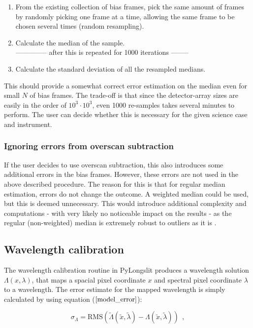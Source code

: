 \documentclass{article}
\begin{document}
\begin{enumerate}
    \item From the existing collection of bias frames, pick the same amount of frames by randomly picking one frame at a time, allowing the same frame to be chosen several times (random resampling).
    \item Calculate the median of the sample. \\ 
    -------------- after this is repeated for 1000 iterations --------
    \item Calculate the standard deviation of all the resampled medians.
\end{enumerate}

\noindent This should provide a somewhat correct error estimation on the median even for small $N$ of bias frames. The trade-off is that since the detector-array sizes are easily in the order of $10^3 \cdot 10^3$, even 1000 re-samples takes several minutes to perform. The user can decide whether this is necessary for the given science case and instrument.

\subsubsection{Ignoring errors from overscan subtraction}\label{ignore_overscan}

If the user decides to use overscan subtraction, this also introduces some additional errors in the bias frames. However, these errors are not used in the above described procedure. The reason for this is that for regular median estimation, errors do not change the outcome. A weighted median could be used, but this is deemed unnecessary. This would introduce additional complexity and computations - with very likely no noticeable impact on the results - as the regular (non-weighted) median is extremely robust to outliers as it is \cite{barlow1995statistics}.

\subsection{Wavelength calibration}

The wavelength calibration routine in PyLongslit produces a wavelength solution $\Lambda(x, \lambda)$, that maps a spacial pixel coordinate $x$ and spectral pixel coordinate $\lambda$ to a wavelength. The error estimate for the mapped wavelength is simply calculated by using equation ($\ref{model_error}$):

\begin{equation}\label{wave_sol_error}
    \sigma_{\Lambda} = \text{RMS}(\tilde{\Lambda}(\tilde{x},\tilde{\lambda}) - \Lambda(\tilde{x},\tilde{\lambda})) \ \ ,
\end{equation}
\end{document}

